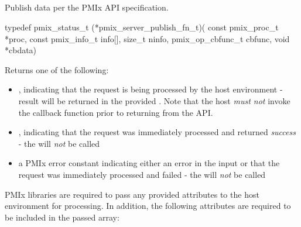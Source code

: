 \subsection{}

\summary

Publish data per the PMIx API specification.

\format

\cspecificstart
\begin{codepar}
typedef pmix_status_t (*pmix_server_publish_fn_t)(
                             const pmix_proc_t *proc,
                             const pmix_info_t info[],
                             size_t ninfo,
                             pmix_op_cbfunc_t cbfunc,
                             void *cbdata)
\end{codepar}
\cspecificend

\begin{arglist}
\end{arglist}

Returns one of the following:

\begin{itemize}
    \item {}, indicating that the request is being processed by the host environment - result will be returned in the provided . Note that the host \emph{must not} invoke the callback function prior to returning from the \ac{API}.
    \item {}, indicating that the request was immediately processed and returned \textit{success} - the  will \textit{not} be called
    \item a PMIx error constant indicating either an error in the input or that the request was immediately processed and failed - the  will \textit{not} be called
\end{itemize}

\reqattrstart
\ac{PMIx} libraries are required to pass any provided attributes to the host environment for processing. In addition, the following attributes are required to be included in the passed  array:

